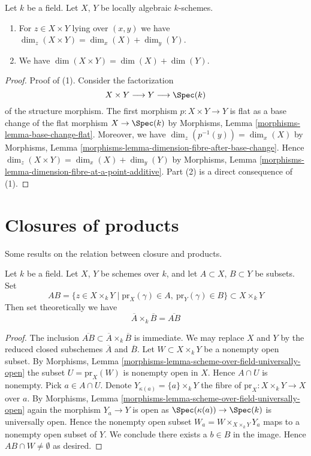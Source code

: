 \begin{lemma}
\label{lemma-dimension-product-locally-algebraic}
Let $k$ be a field. Let $X$, $Y$ be locally algebraic $k$-schemes.
\begin{enumerate}
\item For $z \in X \times Y$ lying over $(x, y)$ we have
$\dim_z(X \times Y) = \dim_x(X) + \dim_y(Y)$.
\item We have $\dim(X \times Y) = \dim(X) + \dim(Y)$.
\end{enumerate}
\end{lemma}

\begin{proof}
Proof of (1). Consider the factorization
$$
X \times Y \longrightarrow Y \longrightarrow \Spec(k)
$$
of the structure morphism. The first morphism $p : X \times Y \to Y$
is flat as a base change of the flat morphism $X \to \Spec(k)$
by Morphisms, Lemma \ref{morphisms-lemma-base-change-flat}.
Moreover, we have $\dim_z(p^{-1}(y)) = \dim_x(X)$ by
Morphisms, Lemma \ref{morphisms-lemma-dimension-fibre-after-base-change}.
Hence $\dim_z(X \times Y) = \dim_x(X) + \dim_y(Y)$ by
Morphisms, Lemma \ref{morphisms-lemma-dimension-fibre-at-a-point-additive}.
Part (2) is a direct consequence of (1).
\end{proof}




\section{Closures of products}
\label{section-closure-of-products}

\noindent
Some results on the relation between closure and products.

\begin{lemma}
\label{lemma-closure-of-product}
Let $k$ be a field.
Let $X$, $Y$ be schemes over $k$, and let
$A \subset X$, $B \subset Y$ be subsets.
Set
$$
AB =
\{z \in X \times_k Y \mid
\text{pr}_X(\gamma) \in A, \ \text{pr}_Y(\gamma) \in B\}
\subset X \times_k Y
$$
Then set theoretically we have
$$
\overline{A} \times_k \overline{B} = \overline{AB}
$$
\end{lemma}

\begin{proof}
The inclusion $\overline{AB} \subset \overline{A} \times_k \overline{B}$
is immediate.
We may replace $X$ and $Y$ by the reduced closed subschemes $\overline{A}$
and $\overline{B}$.
Let $W \subset X \times_k Y$ be a nonempty open subset. By
Morphisms, Lemma \ref{morphisms-lemma-scheme-over-field-universally-open}
the subset $U = \text{pr}_X(W)$ is nonempty open in $X$.
Hence $A \cap U$ is nonempty. Pick $a \in A \cap U$.
Denote $Y_{\kappa(a)} = \{a\} \times_k Y$
the fibre of $\text{pr}_X : X \times_k Y \to X$ over $a$. By
Morphisms, Lemma \ref{morphisms-lemma-scheme-over-field-universally-open}
again the morphism $Y_a \to Y$ is open as
$\Spec(\kappa(a)) \to \Spec(k)$ is universally open.
Hence the nonempty open
subset $W_a = W \times_{X \times_k Y} Y_a$
maps to a nonempty open subset of $Y$.
We conclude there exists a $b \in B$ in the image.
Hence $AB \cap W \not = \emptyset$ as desired.
\end{proof}


